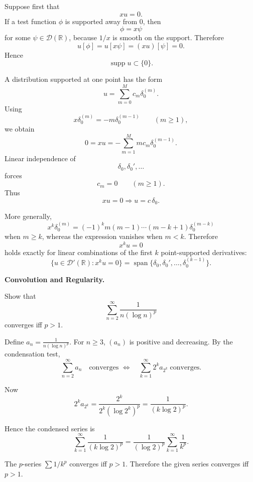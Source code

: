 \begin{solution}
Suppose first that
\[
xu=0.
\]
If a test function \(\phi\) is supported away from \(0\), then
\[
\phi=x\psi
\]
for some \(\psi\in\mathcal D(\mathbb R)\), because \(1/x\) is smooth on the support.
Therefore
\[
u[\phi]
=
u[x\psi]
=
(xu)[\psi]
=
0.
\]
Hence
\[
\operatorname{supp}u\subset\{0\}.
\]

A distribution supported at one point has the form
\[
u=\sum_{m=0}^{M}c_m\delta_0^{(m)}.
\]
Using
\[
x\delta_0^{(m)}
=
-m\delta_0^{(m-1)}
\qquad(m\ge1),
\]
we obtain
\[
0=xu
=
-\sum_{m=1}^{M}m c_m\delta_0^{(m-1)}.
\]
Linear independence of
\[
\delta_0,\delta_0',\ldots
\]
forces
\[
c_m=0
\qquad(m\ge1).
\]
Thus
\[
\boxed{xu=0\Longrightarrow u=c\,\delta_0.}
\]

More generally,
\[
x^k\delta_0^{(m)}
=
(-1)^k
m(m-1)\cdots(m-k+1)\delta_0^{(m-k)}
\]
when \(m\ge k\), whereas the expression vanishes when \(m<k\).
Therefore
\[
x^ku=0
\]
holds exactly for linear combinations of the first \(k\) point-supported derivatives:
\[
\boxed{
\{u\in\mathcal D'(\mathbb R):x^ku=0\}
=
\operatorname{span}
\{\delta_0,\delta_0',\ldots,\delta_0^{(k-1)}\}.
}
\]
\end{solution}


\begin{problem}[CP-II-0063]
\label{prob:cp-ii-0063}
\textbf{Convolution and Regularity.}

\hspace*{1.5em}Show that
\[
\sum_{n=2}^\infty \frac{1}{n(\log n)^p}
\]
converges iff $p>1$.
\end{problem}

\begin{solution}
Define $a_n=\frac{1}{n(\log n)^p}$. For $n\geq 3$, $(a_n)$ is positive and
	decreasing. By the condensation test,
	\[
	\sum_{n=2}^\infty a_n \quad \text{converges } \iff \quad \sum_{k=1}^\infty 2^k a_{2^k} \;\text{converges}.
	\]

	Now
	\[
	2^k a_{2^k} = \frac{2^k}{2^k (\log 2^k)^p} = \frac{1}{(k\log 2)^p}.
	\]

	Hence the condensed series is
	\[
	\sum_{k=1}^\infty \frac{1}{(k\log 2)^p} = \frac{1}{(\log 2)^p}\sum_{k=1}^\infty \frac{1}{k^p}.
	\]

	The $p$-series $\sum 1/k^p$ converges iff $p>1$. Therefore the given series
	converges iff $p>1$.
\end{solution}

